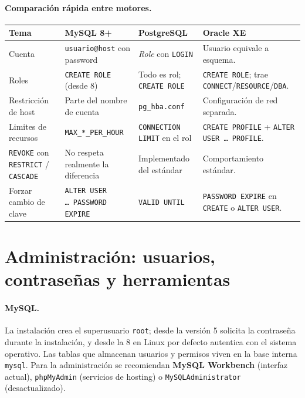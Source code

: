 \documentclass[11pt,a4paper]{article}
\begin{document}
\paragraph{Comparación rápida entre motores.}

\begin{center}
\begin{tabular}{@{}p{3.4cm} p{3.5cm} p{3.5cm} p{3.6cm}@{}}
\toprule
\textbf{Tema} & \textbf{MySQL 8+} & \textbf{PostgreSQL} &
\textbf{Oracle XE} \\
\midrule
Cuenta & \texttt{usuario@host} con password & \emph{Role} con
\texttt{LOGIN} & Usuario equivale a esquema. \\
\addlinespace
Roles & \texttt{CREATE ROLE} (desde 8) & Todo es rol;
\texttt{CREATE ROLE} & \texttt{CREATE ROLE}; trae
\texttt{CONNECT}/\texttt{RESOURCE}/\texttt{DBA}. \\
\addlinespace
Restricción de host & Parte del nombre de cuenta &
\texttt{pg\_hba.conf} & Configuración de red separada. \\
\addlinespace
Limites de recursos & \texttt{MAX\_*\_PER\_HOUR} & \texttt{CONNECTION
LIMIT} en el rol & \texttt{CREATE PROFILE} +
\texttt{ALTER USER \dots\ PROFILE}. \\
\addlinespace
\texttt{REVOKE} con \texttt{RESTRICT} / \texttt{CASCADE} & No respeta
realmente la diferencia & Implementado del estándar & Comportamiento
estándar. \\
\addlinespace
Forzar cambio de clave & \texttt{ALTER USER \dots\ PASSWORD EXPIRE} &
\texttt{VALID UNTIL} & \texttt{PASSWORD EXPIRE} en \texttt{CREATE} o
\texttt{ALTER USER}. \\
\bottomrule
\end{tabular}
\end{center}

\section{Administración: usuarios, contraseñas y herramientas}

\paragraph{MySQL.} La instalación crea el superusuario \texttt{root};
desde la versión 5 solicita la contraseña durante la instalación, y
desde la 8 en Linux por defecto autentica con el sistema operativo. Las
tablas que almacenan usuarios y permisos viven en la base interna
\texttt{mysql}. Para la administración se recomiendan
\textbf{MySQL Workbench} (interfaz actual), \texttt{phpMyAdmin}
(servicios de hosting) o \texttt{MySQLAdministrator} (desactualizado).
\end{document}
